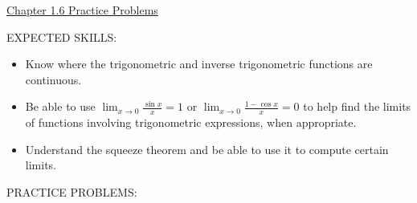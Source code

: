 \documentclass[12pt]{article}
\begin{document}
\begin{center}
\underline{\LARGE{Chapter 1.6 Practice Problems}}
\end{center}

\noindent EXPECTED SKILLS:

\begin{itemize}

\item Know where the trigonometric and inverse trigonometric functions are continuous.

\item Be able to use $\lim_{x\rightarrow0}\frac{\sin{x}}{x}=1$ or $\lim_{x \rightarrow 0}\frac{1-\cos{x}}{x}=0$ to help find the limits of functions involving trigonometric expressions, when appropriate.

\item Understand the squeeze theorem and be able to use it to compute certain limits.

\end{itemize}

\noindent PRACTICE PROBLEMS:

\medskip

\end{document}
